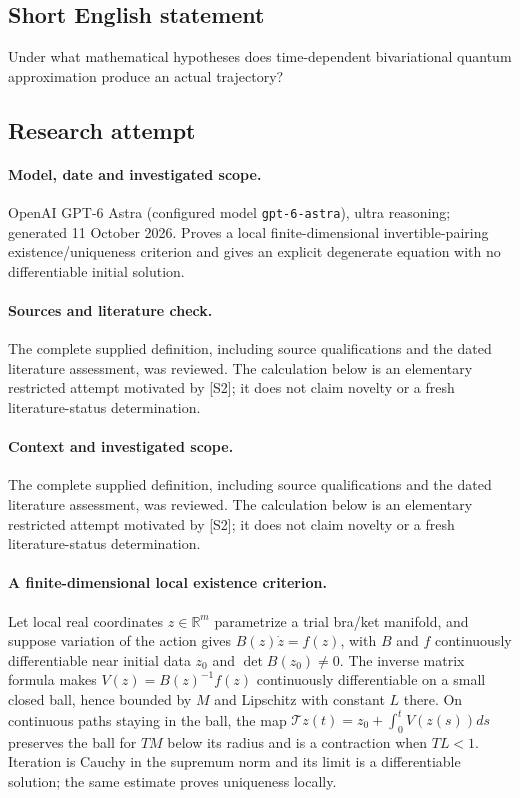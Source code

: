 \documentclass[11pt]{article}
\begin{document}
\subsection{Short English statement}
Under what mathematical hypotheses does time-dependent bivariational quantum approximation produce an actual trajectory?
\subsection{Research attempt}
\paragraph{Model, date and investigated scope.}
OpenAI GPT-6 Astra (configured model \texttt{gpt-6-astra}), ultra reasoning; generated 11 October 2026. Proves a local finite-dimensional invertible-pairing existence/uniqueness criterion and gives an explicit degenerate equation with no differentiable initial solution.

\paragraph{Sources and literature check.}
The complete supplied definition, including source qualifications and the dated literature assessment, was reviewed. The calculation below is an elementary restricted attempt motivated by [S2]; it does not claim novelty or a fresh literature-status determination.

\paragraph{Context and investigated scope.} The complete supplied definition, including source qualifications and the dated literature assessment, was reviewed. The calculation below is an elementary restricted attempt motivated by [S2]; it does not claim novelty or a fresh literature-status determination.

\paragraph{A finite-dimensional local existence criterion.} Let local real coordinates $z\in\mathbb R^m$ parametrize a trial bra/ket manifold, and suppose variation of the action gives $B(z)\dot z=f(z)$, with $B$ and $f$ continuously differentiable near initial data $z_0$ and $\det B(z_0)\ne0$. The inverse matrix formula makes $V(z)=B(z)^{-1}f(z)$ continuously differentiable on a small closed ball, hence bounded by $M$ and Lipschitz with constant $L$ there. On continuous paths staying in the ball, the map $\mathcal Tz(t)=z_0+\int_0^tV(z(s))ds$ preserves the ball for $TM$ below its radius and is a contraction when $TL<1$. Iteration is Cauchy in the supremum norm and its limit is a differentiable solution; the same estimate proves uniqueness locally.
\end{document}
